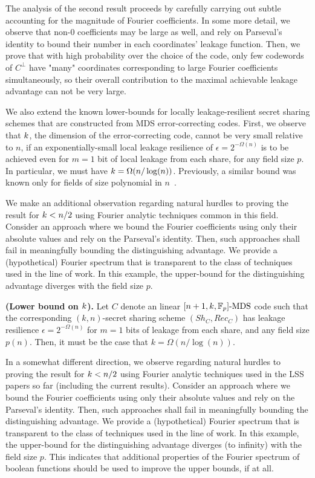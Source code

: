 The analysis of the second result proceeds by carefully carrying out subtle accounting for the magnitude of Fourier coefficients.  In some more detail, we observe that non-0 coefficients may be large as well, and rely on Parseval's identity to bound their number in each coordinates' leakage function. Then, we prove that with high probability over the choice of the code, only few codewords of $C^\bot$ have "many" coordinates corresponding to large Fourier coefficients simultaneously, so their overall contribution to the maximal achievable leakage advantage can not be very large.

We also extend the known lower-bounds for locally leakage-resilient secret sharing schemes that are constructed from MDS error-correcting codes.
First, we observe that $k$, the dimension of the error-correcting code, cannot be very small relative to $n$, if an exponentially-small local leakage resilience of $\epsilon=2^{-\Omega(n)}$ is to be achieved even for $m=1$ bit of local leakage from each share, for any field size $p$.
In particular, we must have $k=\Omega(n/\log(n))$.
Previously, a similar bound was known only for fields of size polynomial in $n$~\cite{NS20}.%

We make an additional observation regarding natural hurdles to proving the result for $k < n/2$ using Fourier analytic techniques common in this field. 
Consider an approach where we bound the Fourier coefficients using only their absolute values and rely on the Parseval's identity. 
Then, such approaches shall fail in meaningfully bounding the distinguishing advantage. 
We provide a (hypothetical) Fourier spectrum that is transparent to the class of techniques used in the line of work.
In this example, the upper-bound for the distinguishing advantage diverges with the field size $p$. 

\begin{theorem}
\textbf{(Lower bound on $k$).}
 Let $C$ denote an linear $[n+1,k,\mathbb{F}_p]\text{-MDS}$ code  such that the corresponding $(k,n)$-secret sharing scheme $(Sh_C,Rec_C)$ has leakage resilience $\epsilon=2^{-\Omega(n)}$ for $m=1$ bits of leakage from each share, and any field size $p(n)$. Then, it must be the case that $k=\Omega(n/\log(n))$.
\end{theorem}

In a somewhat different direction, we observe regarding natural hurdles to proving the result for $k < n/2$ using Fourier analytic techniques used in the LSS papers so far (including the current results). 
Consider an approach where we bound the Fourier coefficients using only their absolute values and rely on the Parseval's identity. 
Then, such approaches shall fail in meaningfully bounding the distinguishing advantage. 
We provide a (hypothetical) Fourier spectrum that is transparent to the class of techniques used in the line of work.
In this example, the upper-bound for the distinguishing advantage diverges (to infinity) with the field size $p$. This indicates that additional properties of the Fourier spectrum of boolean functions should be used to improve the upper bounds, if at all.


